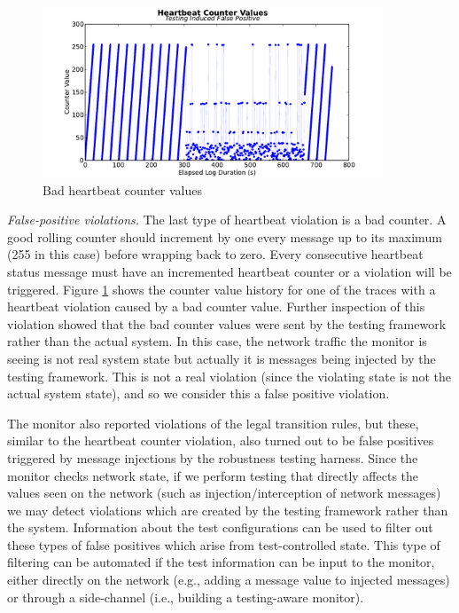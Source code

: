 \begin{figure}[htbp]
\centering
\includegraphics[width=4.0in]{img/hb2}
\caption{Bad heartbeat counter values \label{fig:hb_badcounter}}
\end{figure}

\textit{False-positive violations.}
The last type of heartbeat violation is a bad counter.
A good rolling counter should increment by one every message up to its maximum (255 in this case) before wrapping back to zero.
Every consecutive heartbeat status message must have an incremented heartbeat counter or a violation will be triggered. Figure \ref{fig:hb_badcounter} shows the counter value history for one of the traces with a heartbeat violation caused by a bad counter value.
%
Further inspection of this violation showed that the bad counter values were sent by the testing framework rather than the actual system. In this case, the network traffic the monitor is seeing is not real system state but actually it is messages being injected by the testing framework. This is not a real violation (since the violating state is not the actual system state), and so we consider this a false positive violation.



The monitor also reported violations of the legal transition rules, but these, similar to the heartbeat counter violation, also turned out to be false positives triggered by message injections by the robustness testing harness. Since the monitor checks network state, if we perform testing that directly affects the values seen on the network (such as injection/interception of network messages) we may detect violations which are created by the testing framework rather than the system.
Information about the test configurations can be used to filter out these types of false positives which arise from test-controlled state.
This type of filtering can be automated if the test information can be input to the monitor, either directly on the network (e.g., adding a message value to injected messages) or through a side-channel (i.e., building a testing-aware monitor).
